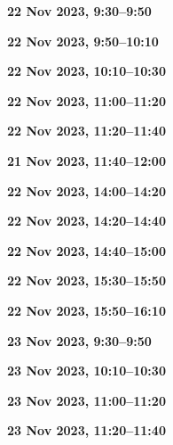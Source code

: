 \documentclass[12pt]{extbook}
\newcommand{\breaktime}[1]{
\bigskip
\begin{center}
\Large\bfseries ***** Break #1 *****
\end{center}
\bigskip}
\renewcommand{\breaktime}[1]{}
\newcommand{\abstract}[2]{{
\bigskip
\begin{center}
\large\bfseries #1
\end{center}}
\par

\clearpage
}
\begin{document}
\abstract{22 Nov 2023, 9:30--9:50}{abstracts/Jacops} %
\abstract{22 Nov 2023, 9:50--10:10}{abstracts/Tomonaga} %
\abstract{22 Nov 2023, 10:10--10:30}{abstracts/Kim} %

\breaktime{30 min}

\abstract{22 Nov 2023, 11:00--11:20}{abstracts/vanLeeuw} %
\abstract{22 Nov 2023, 11:20--11:40}{abstracts/Currle} %
\abstract{21 Nov 2023, 11:40--12:00}{abstracts/Finger}

\breaktime{ / Lunch}

\abstract{22 Nov 2023, 14:00--14:20}{abstracts/Brennwald} %
\abstract{22 Nov 2023, 14:20--14:40}{abstracts/Blanc} %
\abstract{22 Nov 2023, 14:40--15:00}{abstracts/Marion} %

\breaktime{30 min}

\abstract{22 Nov 2023, 15:30--15:50}{abstracts/Picard} %
\abstract{22 Nov 2023, 15:50--16:10}{abstracts/Engelhardt} %



\abstract{23 Nov 2023, 9:30--9:50}{abstracts/Musy} %
\abstract{23 Nov 2023, 10:10--10:30}{abstracts/GroegerTrampe} %

\breaktime{30 min}

\abstract{23 Nov 2023, 11:00--11:20}{abstracts/Iwe} %
\abstract{23 Nov 2023, 11:20--11:40}{abstracts/Slagter} %
\end{document}
